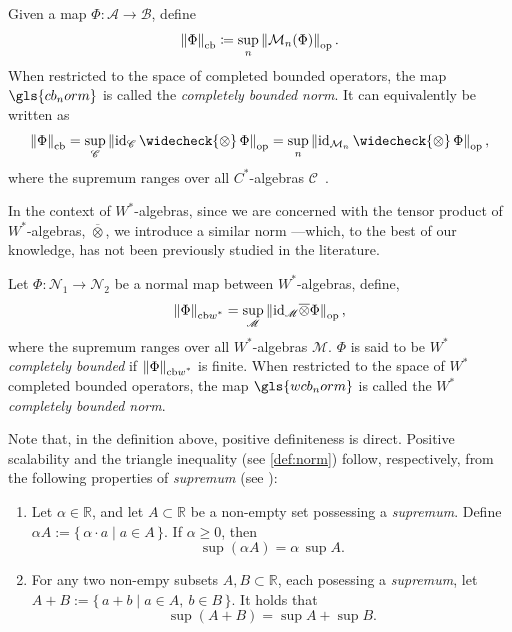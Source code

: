 \begin{definition} \label{def:cb_norm}
Given a map \( \Phi \colon \mathscr{A} \to \mathscr{B} \), define
\[
\left\lVert \Phi \right\rVert_{\text{cb}} \coloneqq \sup_{n} \left\lVert \mathcal{M}_{n}(\Phi) \right\rVert_{\text{op}}.
\]
When restricted to the space of completed bounded operators, the map \( \gls{cb_norm} \) is called the \emph{completely bounded norm}.  
It can equivalently be written as
\[
\cbnorm{\Phi} = \sup_{\mathscr{C}} \opnorm{\id_{\mathscr{C}} \,\widecheck{\otimes}\, \Phi} 
= \sup_{n} \opnorm{\id_{\SqMatrix{n}} \,\widecheck{\otimes}\, \Phi},
\]
where the supremum ranges over all \( C^* \)-algebras \( \mathscr{C} \)~\cite[Introduction, p.~4]{pisierTensorProductsCAlgebras2020}. 
\end{definition} 

In the context of $W^*$-algebras, since we are concerned with the tensor product of $W^*$-algebras, $\overline{\otimes}$, we introduce a similar norm
---which, to the best of our knowledge, has not been previously studied in the literature.
\begin{definition} \label{def:wcb_nor}
  Let $\Phi:\mathscr{N}_1 \to \mathscr{N}_2$ be a normal map between $W^*$-algebras, define,
  \[ \left\lVert \Phi \right\rVert_{\text{cb$w^*$}} = \sup_{\mathscr{M}} \left\lVert \mathrm{id}_{\mathscr{M}} \overline{\otimes} \Phi \right\rVert_{\text{op}}, \]
where the supremum ranges over all $W^*$-algebras \( \mathscr{M} \). $\Phi$ is said to be \emph{$W^*$ completely bounded} if $\left\lVert \Phi \right\rVert_{\text{cb$w^*$}}$ is finite.
When restricted to the space of $W^*$ completed bounded operators, the map \( \gls{wcb_norm}\) is called the \emph{$W^*$ completely bounded norm}.
\end{definition}


Note that, in the definition above, positive definiteness is direct. 
Positive scalability and the triangle inequality (see \autoref{def:norm}) 
follow, respectively, from the following properties of \emph{supremum} (see \cite[Chapter 2, Section 8-9]{zakon2011mathematical}):
\begin{enumerate}
  \item Let \( \alpha \in \mathbb{R} \), and let \( A \subset \mathbb{R} \) be a non-empty set possessing a \emph{supremum}. Define \(\alpha A := \{\, \alpha \cdot a \mid a \in A \,\}
\).
If $\alpha \geq 0$, then
\[
\sup(\alpha A) = \alpha \, \sup A.
\]
 \item For any two non-empy subsets $A, B \subset \mathbb{R}$, each posessing a \emph{supremum},  
let 
\(
A + B := \{\, a + b \mid a \in A, \ b \in B \,\}.
\)
It holds that
\[
\sup(A + B) = \sup A + \sup B .
\]
\end{enumerate}


